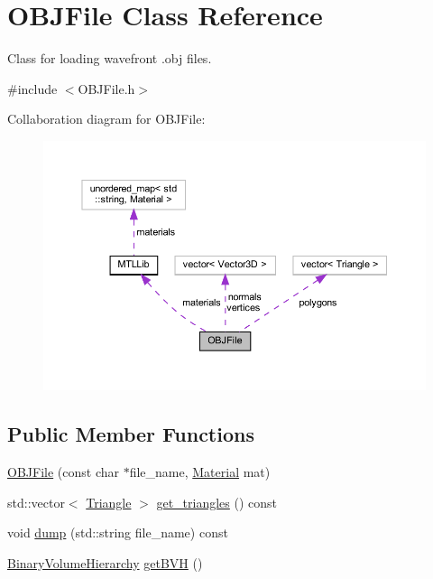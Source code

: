 \hypertarget{classOBJFile}{}\section{O\+B\+J\+File Class Reference}
\label{classOBJFile}


Class for loading wavefront .obj files.  




{\ttfamily \#include $<$O\+B\+J\+File.\+h$>$}



Collaboration diagram for O\+B\+J\+File\+:
\nopagebreak
\begin{figure}[H]
\begin{center}
\leavevmode
\includegraphics[width=350pt]{classOBJFile__coll__graph}
\end{center}
\end{figure}
\subsection*{Public Member Functions}
\begin{DoxyCompactItemize}
\item 
\mbox{\hyperlink{classOBJFile_ac6c14cded889593868aaab4e7d3e4bfb}{O\+B\+J\+File}} (const char $\ast$file\+\_\+name, \mbox{\hyperlink{classMaterial}{Material}} mat)
\item 
std\+::vector$<$ \mbox{\hyperlink{classTriangle}{Triangle}} $>$ \mbox{\hyperlink{classOBJFile_a109fb06479ee891b78401e95e8b5b64e}{get\+\_\+triangles}} () const
\item 
void \mbox{\hyperlink{classOBJFile_adb2b2bb5e0a2920a2886272a1c9ebdab}{dump}} (std\+::string file\+\_\+name) const
\item 
\mbox{\hyperlink{classBinaryVolumeHierarchy}{Binary\+Volume\+Hierarchy}} \mbox{\hyperlink{classOBJFile_ae3128b473a8b7b837364cc9688cb89dc}{get\+B\+VH}} ()
\end{DoxyCompactItemize}
